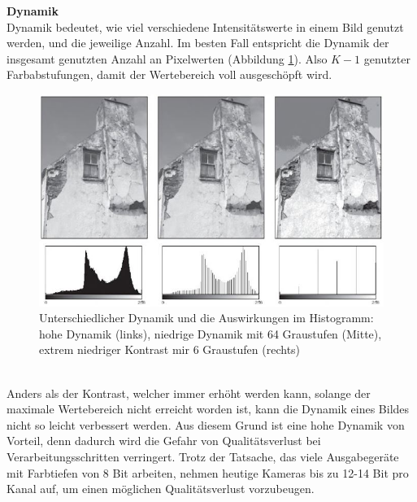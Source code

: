 \documentclass[a4paper,12pt,oneside]{article}
\begin{document}
\textbf{Dynamik}\label{s.dynamik}\\
Dynamik bedeutet, wie viel verschiedene Intensitätswerte in einem Bild genutzt werden, und die jeweilige Anzahl\cite[44]{burger2009digitale}. Im besten Fall entspricht die Dynamik der insgesamt genutzten Anzahl an Pixelwerten (Abbildung \ref{img:dynamik}). Also $K-1$ genutzter Farbabstufungen, damit der Wertebereich voll ausgeschöpft wird.\\
 \begin{figure}
    [h]
    \centering
    \includegraphics[scale=0.7]{Sources/dynamik.JPG}
    \caption{Unterschiedlicher Dynamik und die Auswirkungen im Histogramm: hohe Dynamik (links), niedrige Dynamik mit 64 Graustufen (Mitte), extrem niedriger Kontrast mir 6 Graustufen (rechts)\cite[45]{burger2009digitale}}
    \label{img:dynamik}
  \end{figure}\\
Anders als der Kontrast, welcher immer erhöht werden kann, solange der maximale Wertebereich nicht erreicht worden ist, kann die Dynamik eines Bildes nicht so leicht verbessert werden. Aus diesem Grund ist eine hohe Dynamik von Vorteil, denn dadurch wird die Gefahr von Qualitätsverlust bei Verarbeitungsschritten verringert. Trotz der Tatsache, das viele Ausgabegeräte mit Farbtiefen von 8 Bit arbeiten, nehmen heutige Kameras bis zu 12-14 Bit pro Kanal auf, um einen möglichen Qualitätsverlust vorzubeugen.
\newpage
\end{document}
